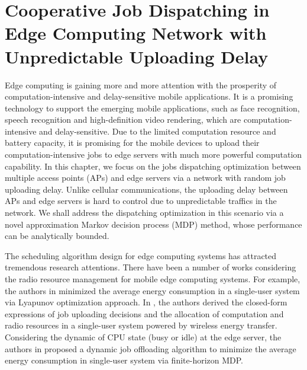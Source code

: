 \chapter{Cooperative Job Dispatching in Edge Computing Network with Unpredictable Uploading Delay}
\label{ch3_prev}

Edge computing is gaining more and more attention with the prosperity of computation-intensive and delay-sensitive mobile applications.
It is a promising technology to support the emerging mobile applications, such as face recognition, speech recognition and high-definition video rendering, which are computation-intensive and delay-sensitive.
Due to the limited computation resource and battery capacity, it is promising for the mobile devices to upload their computation-intensive jobs to edge servers with much more powerful computation capability. In this chapter, we focus on the jobs dispatching optimization between multiple access points (APs) and edge servers via a network with random job uploading delay. Unlike cellular communications, the uploading delay between APs and edge servers is hard to control due to unpredictable traffics in the network. We shall address the dispatching optimization in this scenario via a novel approximation Markov decision process (MDP) method, whose performance can be analytically bounded.

The scheduling algorithm design for edge computing systems has attracted tremendous research attentions.
There have been a number of works considering the radio resource management for mobile edge computing systems. For example, the authors in \cite{Junzhang2016} minimized the average energy consumption in a single-user system via Lyapunov optimization approach. In \cite{KBHuang2015}, the authors derived the closed-form expressions of job uploading decisions and the allocation of computation and radio resources in a single-user system powered by wireless energy transfer.
Considering the dynamic of CPU state (busy or idle) at the edge server, the authors in \cite{KBHuang2019} proposed a dynamic job offloading algorithm to minimize the average energy consumption in single-user system via finite-horizon MDP.

